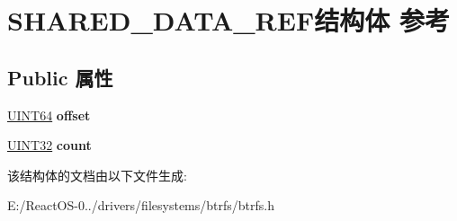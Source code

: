 \hypertarget{struct_s_h_a_r_e_d___d_a_t_a___r_e_f}{}\section{S\+H\+A\+R\+E\+D\+\_\+\+D\+A\+T\+A\+\_\+\+R\+E\+F结构体 参考}
\label{struct_s_h_a_r_e_d___d_a_t_a___r_e_f}
\subsection*{Public 属性}
\begin{DoxyCompactItemize}
\item 
\mbox{\label{struct_s_h_a_r_e_d___d_a_t_a___r_e_f_add3d739ca7e3aafa93988dec7149ae5a}} 
\hyperlink{_processor_bind_8h_a57be03562867144161c1bfee95ca8f7c}{U\+I\+N\+T64} {\bfseries offset}
\item 
\mbox{\label{struct_s_h_a_r_e_d___d_a_t_a___r_e_f_a87780bca8c580b5ef02ec6935929cd56}} 
\hyperlink{_processor_bind_8h_ae1e6edbbc26d6fbc71a90190d0266018}{U\+I\+N\+T32} {\bfseries count}
\end{DoxyCompactItemize}


该结构体的文档由以下文件生成\+:\begin{DoxyCompactItemize}
\item 
E\+:/\+React\+O\+S-\/0../drivers/filesystems/btrfs/btrfs.\+h\end{DoxyCompactItemize}
